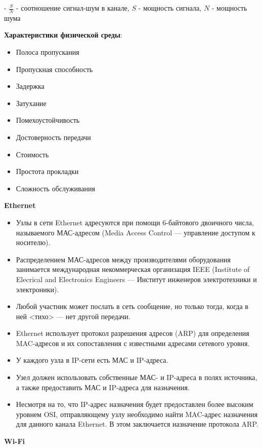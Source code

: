 - $\frac{S}{N}$ - соотношение сигнал-шум в канале,  $S$ - мощность сигнала, $N$ - мощность шума
    
\textbf{Характеристики физической среды}:    
\begin{itemize}
    \item Полоса пропускания
    \item Пропускная способность
    \item Задержка
    \item Затухание
    \item Помехоустойчивость
    \item Достоверность передачи
    \item Стоимость
    \item Простота прокладки
    \item Сложность обслуживания
\end{itemize}


\textbf{\textbf{Ethernet}}

\begin{itemize}
    \item Узлы в сети Ethernet адресуются при помощи 6-байтового двоичного числа, называемого МАС-адресом (Media Access Control — управление доступом к носителю).
    \item Распределением МАС-адресов между производителями оборудования занимается международная некоммерческая организация IEEE (Institute of Elecrical and Electronics Engineers — Институт инженеров электротехники и электроники).
    \item Любой участник может послать в сеть сообщение, но только тогда, когда в ней <тихо> --- нет другой передачи.
    \item Ethernet использует протокол разрешения адресов (ARP) для определения MAC-адресов и их сопоставления с известными адресами сетевого уровня. 
    \item У каждого узла в IP-сети есть МАС и IP-адреса. 
    \item Узел должен использовать собственные МАС- и IP-адреса в полях источника, а также предоставить МАС и IP-адреса для назначения. 
   \item  Несмотря на то, что IP-адрес назначения будет предоставлен более высоким уровнем OSI, отправляющему узлу необходимо найти MAC-адрес назначения для данного канала Ethernet. 
    В этом заключается назначение протокола ARP.
\end{itemize}

\textbf{\textbf{Wi-Fi}}

